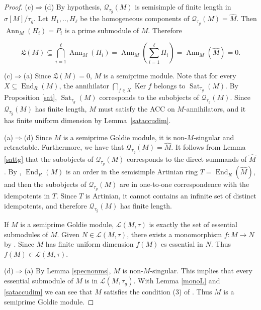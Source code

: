 \documentclass{amsart}
\theoremstyle{definition}
\theoremstyle{remark}
\numberwithin{equation}{section}
\DeclareMathOperator{\Ann}{Ann}
\DeclareMathOperator{\Ker}{Ker}
\DeclareMathOperator{\End}{End}
\DeclareMathOperator{\Sat}{Sat}
\newcommand{\sm}{\sigma[M]}
\begin{document}
\begin{proof}
		(c)$\Rightarrow$(d) By hypothesis, $\mathcal{Q}_{\tau_g}(M)$ is semisimple of finite length in $\sm/\tau_g$. Let $H_1,.., H_\ell$ be the homogeneous components of $\mathcal{Q}_{\tau_g}(M)=\widehat{M}$. Then $\Ann_M(H_i)=P_i$ is a prime submodule of $M$. Therefore 
		
		\[\mathfrak{L}(M)\subseteq\bigcap_{i=1}^\ell\Ann_M(H_i)=\Ann_M\left(\sum_{i=1}^\ell H_i\right)=\Ann_M(\widehat{M})=0.\]
		
		(c)$\Rightarrow$(a) 
		Since $\mathfrak{L}(M)=0$, $M$ is a semiprime module.
		Note that for every $X\subseteq\End_R(M)$, the annihilator
		$\bigcap_{f\in X}\Ker f$ belongs to $\Sat_{\tau_g}(M)$.
		By Proposition \ref{sat}, 
		$\Sat_{\tau_g}(M)$ corresponds to the subobjects of 
		$\mathcal{Q}_{\tau_g}(M)$. 
		Since $\mathcal{Q}_{\tau_g}(M)$ has finite length, 
		$M$ must satisfy the ACC on $M$-annihilators, 
		and it has finite uniform dimension by Lemma~\ref{sataccudim}.
		
		(a)$\Rightarrow$(d)
		Since $M$ is a semiprime Goldie module, 
		it is non-$M$-singular and retractable. 
		Furthermore, we have that $\mathcal{Q}_{\tau_g}(M)=\widehat{M}$. 
		It follows from Lemma \ref{sattg} 
		that the subobjects of $\mathcal{Q}_{\tau_g}(M)$ 
		corresponds to the direct summands of $\widehat{M}$. 
		By \cite[Theorem 2.22]{maugoldie}, 
		$\End_R(M)$ is an order in the semisimple Artinian ring 
		$T=\End_R(\widehat{M})$, 
		and then the subobjects of $\mathcal{Q}_{\tau_g}(M)$ 
		are in one-to-one correspondence with the idempotents in $T$. 
		Since $T$ is Artinian, 
		it cannot contains an infinite set of distinct idempotents, 
		and therefore $\mathcal{Q}_{\tau_g}(M)$ has finite length. 
		
		If $M$ is a semiprime Goldie module, $\mathcal{L}(M,\tau)$ is exactly the set of essential submodules of $M$. Given $N\in\mathcal{L}(M,\tau)$, there exists a monomorphism $f:M\to N$ by \cite[Theorem 2.8]{maugoldie}. Since $M$ has finite uniform dimension $f(M)$ es essential in $N$. Thus $f(M)\in\mathcal{L}(M,\tau)$. 
		
		(d)$\Rightarrow$(a) By Lemma \ref{specnonms}, $M$ is non-$M$-singular. This implies that every essential submodule of $M$ is in $\mathcal{L}(M,\tau_g)$. With Lemma \ref{monoL} and \ref{sataccudim} we can see that $M$ satisfies the condition (3) of \cite[Theorem 2.8]{maugoldie}. Thus $M$ is a semiprime Goldie module.
	\end{proof}
	
\end{document}
